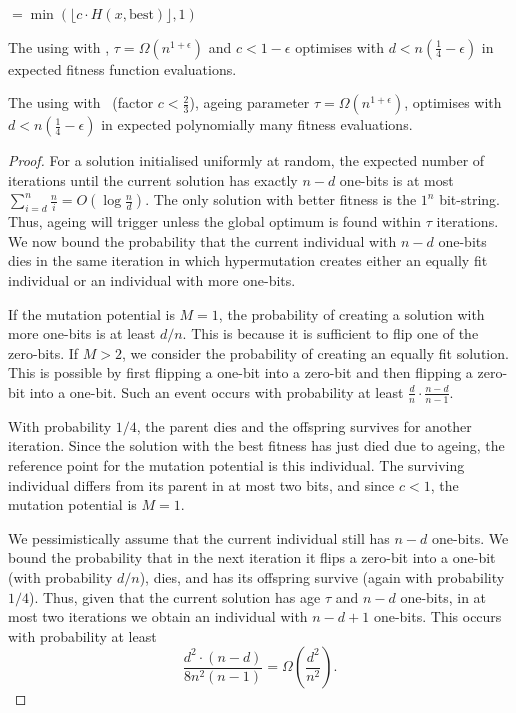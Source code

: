 \documentclass[lettersize,journal]{IEEEtran}
\begin{document}
\linHD $=\min\left(\lfloor c \cdot H(x,\text{best}) \rfloor, 1 \right)$ 

\begin{theorem} \label{th:expoHD-cliff}
	The {\oneoneOPTIA } using \IPHfcm{} with \linHD,  $\tau=\Omega(n^{1+\epsilon})$ and $c<1-\epsilon$ optimises \cliff{} with 
	$d<n(\frac{1}{4}-\epsilon)$ in 
	{\color{blue}  expected fitness function evaluations.}
\end{theorem} 
\begin{theorem}\label{th:expoHD-cliff}
	The {\oneoneOPTIA} using \IPHfcm{} with \linHD\ (factor $c<\tfrac{2}{3}$), ageing parameter $\tau=\Omega(n^{1+\epsilon})$, optimises \cliff{} with $d<n(\tfrac{1}{4}-\epsilon)$ in expected polynomially many fitness evaluations.
\end{theorem}
\begin{proof}
For a solution initialised uniformly at random, the expected number of iterations until the current solution has exactly $n - d$ one-bits is at most $\sum_{i=d}^{n}\frac{n}{i} = O(\log \frac{n}{d})$. The only solution with better fitness is the $1^n$ bit-string. Thus, ageing will trigger unless the global optimum is found within $\tau$ iterations. We now bound the probability that the current individual with $n - d$ one-bits dies in the same iteration in which hypermutation creates either an equally fit individual or an individual with more one-bits.

If the mutation potential is $M = 1$, the probability of creating a solution with more one-bits is at least $d/n$. This is because it is sufficient to flip one of the zero-bits. If $M > 2$, we consider the probability of creating an equally fit solution. This is possible by first flipping a one-bit into a zero-bit and then flipping a zero-bit into a one-bit. Such an event occurs with probability at least $\frac{d}{n}\cdot \frac{n - d}{n - 1}$.

With probability $1/4$, the parent dies and the offspring survives for another iteration. Since the solution with the best fitness has just died due to ageing, the reference point for the mutation potential is this individual. The surviving individual differs from its parent in at most two bits, and since $c < 1$, the mutation potential is $M = 1$.

We pessimistically assume that the current individual still has $n - d$ one-bits. We bound the probability that in the next iteration it flips a zero-bit into a one-bit (with probability $d/n$), dies, and has its offspring survive (again with probability $1/4$). Thus, given that the current solution has age $\tau$ and $n - d$ one-bits, in at most two iterations we obtain an individual with $n - d + 1$ one-bits. This occurs with probability at least
\[
\frac{d^2\cdot(n - d)}{8n^2(n - 1)} = \Omega\left(\frac{d^2}{n^2}\right).
\]


\end{proof}
\end{document}
